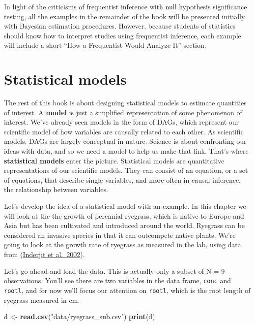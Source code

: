 \documentclass[
]{book}
\newenvironment{Shaded}{\begin{snugshade}}{\end{snugshade}}
\newcommand{\FunctionTok}[1]{\textcolor[rgb]{0.13,0.29,0.53}{\textbf{#1}}}
\newcommand{\NormalTok}[1]{#1}
\newcommand{\OtherTok}[1]{\textcolor[rgb]{0.56,0.35,0.01}{#1}}
\newcommand{\StringTok}[1]{\textcolor[rgb]{0.31,0.60,0.02}{#1}}
\begin{document}
In light of the criticisms of frequentist inference with null hypothesis significance testing, all the examples in the remainder of the book will be presented initially with Bayesian estimation procedures. However, because students of statistics should know how to interpret studies using frequentist inference, each example will include a short ``How a Frequentist Would Analyze It'' section.

\section{Statistical models}\label{statistical-models}

The rest of this book is about designing statistical models to estimate quantities of interest. A \textbf{model} is just a simplified representation of some phenomenon of interest. We've already seen models in the form of DAGs, which represent our scientific model of how variables are causally related to each other. As scientific models, DAGs are largely conceptual in nature. Science is about confronting our ideas with data, and so we need a model to help us make that link. That's where \textbf{statistical models} enter the picture. Statistical models are quantitative representations of our scientific models. They can consist of an equation, or a set of equations, that describe single variables, and more often in causal inference, the relationship between variables.

Let's develop the idea of a statistical model with an example. In this chapter we will look at the the growth of perennial ryegrass, which is native to Europe and Asia but has been cultivated and introduced around the world. Ryegrass can be considered an invasive species in that it can outcompete native plants. We're going to look at the growth rate of ryegrass as measured in the lab, using data from (\href{https://doi.org/10.1034/j.1399-3054.2002.1140312.x}{Inderjit et al.~2002}).

Let's go ahead and load the data. This is actually only a subset of N = 9 observations. You'll see there are two variables in the data frame, \texttt{conc} and \texttt{rootl}, and for now we'll focus our attention on \texttt{rootl}, which is the root length of ryegrass measured in cm.

\begin{Shaded}
\begin{Highlighting}[]
\NormalTok{d }\OtherTok{\textless{}{-}} \FunctionTok{read.csv}\NormalTok{(}\StringTok{"data/ryegrass\_sub.csv"}\NormalTok{)}
\FunctionTok{print}\NormalTok{(d)}
\end{Highlighting}
\end{Shaded}
\end{document}
